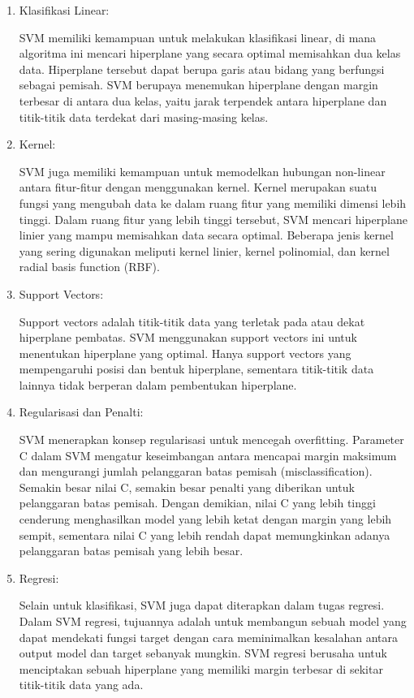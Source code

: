 \begin{enumerate}[nolistsep]
  \item Klasifikasi Linear:

        SVM memiliki kemampuan untuk melakukan klasifikasi linear, di mana
        algoritma ini mencari hiperplane yang secara optimal memisahkan dua kelas
        data. Hiperplane tersebut dapat berupa garis atau bidang yang berfungsi
        sebagai pemisah. SVM berupaya menemukan hiperplane dengan margin terbesar
        di antara dua kelas, yaitu jarak terpendek antara hiperplane dan titik-titik
        data terdekat dari masing-masing kelas.

  \item Kernel:

        SVM juga memiliki kemampuan untuk memodelkan hubungan non-linear antara
        fitur-fitur dengan menggunakan kernel. Kernel merupakan suatu fungsi
        yang mengubah data ke dalam ruang fitur yang memiliki dimensi lebih
        tinggi. Dalam ruang fitur yang lebih tinggi tersebut, SVM mencari
        hiperplane linier yang mampu memisahkan data secara optimal. Beberapa
        jenis kernel yang sering digunakan meliputi kernel linier, kernel
        polinomial, dan kernel radial basis function (RBF).

  \item Support Vectors:

        Support vectors adalah titik-titik data yang terletak pada atau dekat
        hiperplane pembatas. SVM menggunakan support vectors ini untuk
        menentukan hiperplane yang optimal. Hanya support vectors yang
        mempengaruhi posisi dan bentuk hiperplane, sementara titik-titik data
        lainnya tidak berperan dalam pembentukan hiperplane.

  \item Regularisasi dan Penalti:

        SVM menerapkan konsep regularisasi untuk mencegah overfitting.
        Parameter C dalam SVM mengatur keseimbangan antara mencapai margin
        maksimum dan mengurangi jumlah pelanggaran batas pemisah
        (misclassification). Semakin besar nilai C, semakin besar penalti
        yang diberikan untuk pelanggaran batas pemisah. Dengan demikian,
        nilai C yang lebih tinggi cenderung menghasilkan model yang lebih
        ketat dengan margin yang lebih sempit, sementara nilai C yang lebih
        rendah dapat memungkinkan adanya pelanggaran batas pemisah yang lebih
        besar.

  \item Regresi:

        Selain untuk klasifikasi, SVM juga dapat diterapkan dalam tugas
        regresi. Dalam SVM regresi, tujuannya adalah untuk membangun sebuah
        model yang dapat mendekati fungsi target dengan cara meminimalkan
        kesalahan antara output model dan target sebanyak mungkin. SVM regresi
        berusaha untuk menciptakan sebuah hiperplane yang memiliki margin
        terbesar di sekitar titik-titik data yang ada.
\end{enumerate}
